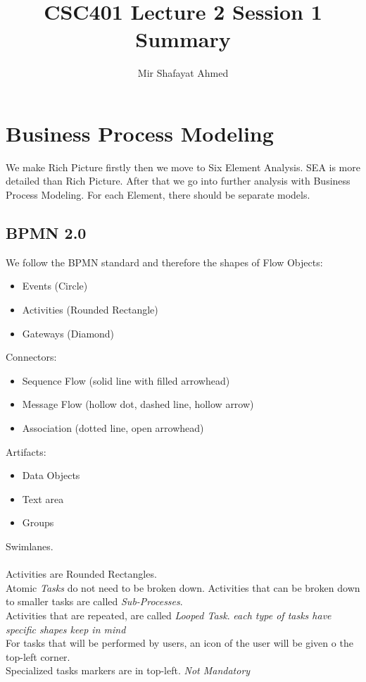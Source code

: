 \documentclass{article}
\title{CSC401 Lecture 2 Session 1 Summary}
\author{Mir Shafayat Ahmed}
\begin{document}
    \pagecolor[HTML]{FFFFCC}
    \maketitle
    \section*{Business Process Modeling}
        We make Rich Picture firstly then we move to Six Element Analysis. SEA is more detailed than Rich Picture. After that we go into further analysis with Business Process Modeling.
        For each Element, there should be separate models.
        \subsection*{BPMN 2.0}
            We follow the BPMN standard and therefore the shapes of Flow Objects:
            \begin{itemize}
                \item Events (Circle)
                \item Activities (Rounded Rectangle)
                \item Gateways (Diamond)
            \end{itemize}
            Connectors: 
            \begin{itemize}
                \item Sequence Flow (solid line with filled arrowhead)
                \item Message Flow (hollow dot, dashed line, hollow arrow)
                \item Association (dotted line, open arrowhead)
            \end{itemize}
            Artifacts:
            \begin{itemize}
                \item Data Objects
                \item Text area
                \item Groups
            \end{itemize}
            Swimlanes.

            \paragraph{}
            Activities are Rounded Rectangles.\\
            Atomic \emph{Tasks} do not need to be broken down.
            Activities that can be broken down to smaller tasks are called \emph{Sub-Processes}.\\
            Activities that are repeated, are called \emph{Looped Task}.
            \emph{each type of tasks have specific shapes keep in mind}\\
            For tasks that will be performed by users, an icon of the user will be given o the top-left corner.\\
            Specialized tasks markers are in top-left. \emph{Not Mandatory}\\
\end{document}
